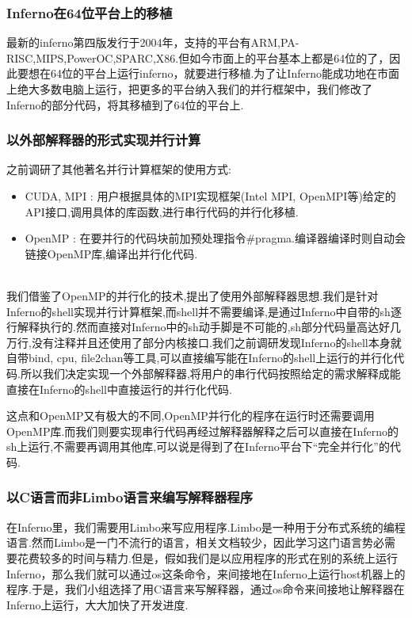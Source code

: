 \documentclass[paper=a4]{ctexart} %
\numberwithin{equation}{section} %
\numberwithin{figure}{section} %
\numberwithin{table}{section} %
\newcommand{\n}{\\\indent}
\begin{document}
\subsubsection{Inferno在64位平台上的移植}
最新的inferno第四版发行于2004年，支持的平台有ARM,PA-RISC,MIPS,PowerOC,SPARC,X86.但如今市面上的平台基本上都是64位的了，因此要想在64位的平台上运行inferno，就要进行移植.为了让Inferno能成功地在市面上绝大多数电脑上运行，把更多的平台纳入我们的并行框架中，我们修改了Inferno的部分代码，将其移植到了64位的平台上.

\subsubsection{以外部解释器的形式实现并行计算}
之前调研了其他著名并行计算框架的使用方式:
\begin{itemize}
\item CUDA, MPI : 用户根据具体的MPI实现框架(Intel MPI, OpenMPI等)给定的API接口,调用具体的库函数,进行串行代码的并行化移植.
\item OpenMP : 在要并行的代码块前加预处理指令\#pragma.编译器编译时则自动会链接OpenMP库,编译出并行化代码.
\end{itemize} 
~\n
我们借鉴了OpenMP的并行化的技术,提出了使用外部解释器思想.我们是针对Inferno的shell实现并行计算框架,而shell并不需要编译,是通过Inferno中自带的sh逐行解释执行的.然而直接对Inferno中的sh动手脚是不可能的,sh部分代码量高达好几万行,没有注释并且还使用了部分内核接口.我们之前调研发现Inferno的shell本身就自带bind, cpu, file2chan等工具,可以直接编写能在Inferno的shell上运行的并行化代码.所以我们决定实现一个外部解释器,将用户的串行代码按照给定的需求解释成能直接在Inferno的shell中直接运行的并行化代码.\n

这点和OpenMP又有极大的不同,OpenMP并行化的程序在运行时还需要调用OpenMP库.而我们则要实现串行代码再经过解释器解释之后可以直接在Inferno的sh上运行,不需要再调用其他库,可以说是得到了在Inferno平台下“完全并行化”的代码.

\subsubsection{以C语言而非Limbo语言来编写解释器程序}
在Inferno里，我们需要用Limbo来写应用程序.Limbo是一种用于分布式系统的编程语言.然而Limbo是一门不流行的语言，相关文档较少，因此学习这门语言势必需要花费较多的时间与精力.但是，假如我们是以应用程序的形式在别的系统上运行Inferno，那么我们就可以通过os这条命令，来间接地在Inferno上运行host机器上的程序.于是，我们小组选择了用C语言来写解释器，通过os命令来间接地让解释器在Inferno上运行，大大加快了开发进度.
\end{document}
